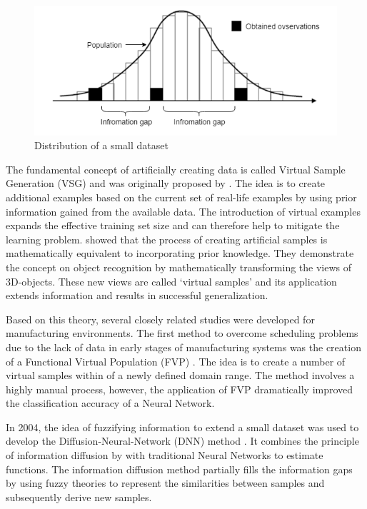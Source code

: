 \documentclass[parskip=full]{scrartcl}
\begin{document}
\begin{figure}[H]
	\centering
	\includegraphics[width=0.6\linewidth]{"./resources/small_data_distribution"}
	\caption{Distribution of a small dataset \cite{Tsai.2015}}
	\label{fig:small-data-distribution}
\end{figure}

The fundamental concept of artificially creating data is called Virtual Sample Generation (VSG) and was 
originally proposed by \cite{Niyogi.1998}. The idea is to create additional examples based on the current 
set of real-life examples by using prior information gained from the available data. The introduction of 
virtual examples expands the effective training set size and can therefore help to mitigate the learning 
problem. \cite{Niyogi.1998} showed that the process of creating artificial samples is mathematically 
equivalent to incorporating prior knowledge. They demonstrate the concept on object recognition by 
mathematically transforming the views of 3D-objects. These new views are called ‘virtual 
samples’ and its application extends information and results in successful generalization. 

Based on this theory, several closely related studies were developed for manufacturing environments. 
The first method to overcome scheduling problems due to the lack of data in early stages of 
manufacturing systems was the creation of a Functional Virtual Population (FVP) \cite{Li.2003}. The idea 
is to create a number of virtual samples within of a newly defined domain range. The method involves a 
highly manual process, however, the application of FVP dramatically improved the classification 
accuracy of a Neural Network. 

In 2004, the idea of fuzzifying information to extend a small dataset was used to develop the 
Diffusion-Neural-Network (DNN) method \cite{Huang.2004}. It combines the principle of information 
diffusion by \cite{Huang.1997} with  traditional Neural Networks to estimate functions. The information 
diffusion method partially fills the information gaps by using fuzzy theories to represent the similarities 
between samples and subsequently derive new samples. 
\end{document}
